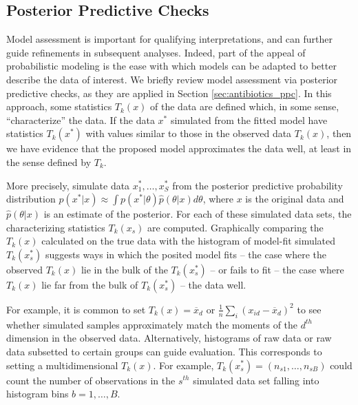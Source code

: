 \documentclass[oupdraft]{bio}
\begin{document}
\subsection{Posterior Predictive Checks}
\label{sec:ppc_overview}

Model assessment is important for qualifying interpretations, and can further
guide refinements in subsequent analyses. Indeed, part of the appeal of
probabilistic modeling is the ease with which models can be adapted to better
describe the data of interest. We briefly review model assessment via posterior
predictive checks, as they are applied in Section \ref{sec:antibiotics_ppc}. In
this approach, some statistics $T_{k}\left(x\right)$ of the data are defined
which, in some sense, ``characterize'' the data. If the data $x^{\ast}$
simulated from the fitted model have statistics $T_{k}\left(x^{\ast}\right)$
with values similar to those in the observed data $T_{k}\left(x\right)$, then we
have evidence that the proposed model approximates the data well, at least in
the sense defined by $T_{k}$.

More precisely, simulate data $x_{1}^{\ast}, \dots, x_{S}^{\ast}$ from the
posterior predictive probability distribution $p\left(x^{\ast}\vert x\right)
\approx \int p\left(x^{\ast} \vert \theta\right) \hat{p}\left(\theta \vert x
\right)d\theta$, where $x$ is the original data and $\hat{p}\left(\theta \vert
x\right)$ is an estimate of the posterior. For each of these simulated data
sets, the characterizing statistics $T_{k}\left(x_{s}\right)$ are computed.
Graphically comparing the $T_{k}\left(x\right)$ calculated on the true data with
the histogram of model-fit simulated $T_{k}\left(x_{s}^{\ast}\right)$ suggests
ways in which the posited model fits -- the case where the observed
$T_{k}\left(x\right)$ lie in the bulk of the $T_{k}\left(x^{\ast}_{s}\right)$ --
or fails to fit -- the case where $T_{k}\left(x\right)$ lie far from the bulk of
$T_{k}\left(x^{\ast}_{s}\right)$ -- the data well.

For example, it is common to set $T_{k}\left(x\right) = \overline{x}_d$ or
$\frac{1}{n}\sum_{i} \left(x_{id} - \overline{x}_d\right)^{2}$ to see whether
simulated samples approximately match the moments of the $d^{th}$ dimension in
the observed data. Alternatively, histograms of raw data or raw data subsetted
to certain groups can guide evaluation. This corresponds to setting a
multidimensional $T_{k}\left(x\right)$. For example, $T_k\left(x_{s}^\ast\right)
= \left(n_{s1}, \dots, n_{sB}\right)$ could count the number of observations in
the $s^{th}$ simulated data set falling into histogram bins $b = 1, \dots, B$.
\end{document}
